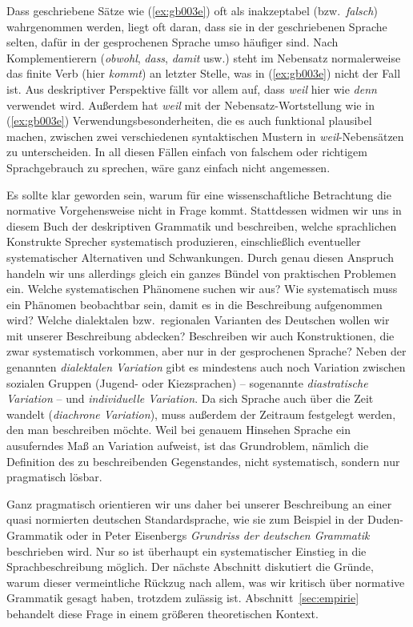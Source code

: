 Dass geschriebene Sätze wie (\ref{ex:gb003e}) oft als inakzeptabel (bzw.\ \textit{falsch}) wahrgenommen werden, liegt oft daran, dass sie in der geschriebenen Sprache selten, dafür in der gesprochenen Sprache umso häufiger sind.
Nach Komplementierern (\textit{obwohl}, \textit{dass}, \textit{damit} usw.) steht im Nebensatz normalerweise das finite Verb (hier \textit{kommt}) an letzter Stelle, was in (\ref{ex:gb003e}) nicht der Fall ist.
Aus deskriptiver Perspektive fällt vor allem auf, dass \textit{weil} hier wie \textit{denn} verwendet wird.
Außerdem hat \textit{weil} mit der Nebensatz-Wortstellung wie in (\ref{ex:gb003e}) Verwendungsbesonderheiten, die es auch funktional plausibel machen, zwischen zwei verschiedenen syntaktischen Mustern in \textit{weil}-Nebensätzen zu unterscheiden.
In all diesen Fällen einfach von falschem oder richtigem Sprachgebrauch zu sprechen, wäre ganz einfach nicht angemessen.

Es sollte klar geworden sein, warum für eine wissenschaftliche Betrachtung die normative Vorgehensweise nicht in Frage kommt.
Stattdessen widmen wir uns in diesem Buch der deskriptiven Grammatik und beschreiben, welche sprachlichen Konstrukte Sprecher systematisch produzieren, einschließlich eventueller systematischer Alternativen und Schwankungen.
Durch genau diesen Anspruch handeln wir uns allerdings gleich ein ganzes Bündel von praktischen Problemen ein.
Welche systematischen Phänomene suchen wir aus?
Wie systematisch muss ein Phänomen beobachtbar sein, damit es in die Beschreibung aufgenommen wird?
Welche dialektalen bzw.\ regionalen Varianten des Deutschen wollen wir mit unserer Beschreibung abdecken?
Beschreiben wir auch Konstruktionen, die zwar systematisch vorkommen, aber nur in der gesprochenen Sprache?
Neben der genannten \textit{dialektalen Variation} gibt es mindestens auch noch Variation zwischen sozialen Gruppen (\zB Jugend- oder Kiezsprachen) -- sogenannte \textit{diastratische Variation} -- und \textit{individuelle Variation}.
Da sich Sprache auch über die Zeit wandelt (\textit{diachrone Variation}), muss außerdem der Zeitraum festgelegt werden, den man beschreiben möchte.
Weil bei genauem Hinsehen Sprache ein ausuferndes Maß an Variation aufweist, ist das Grundroblem, nämlich die Definition des zu beschreibenden Gegenstandes, nicht systematisch, sondern nur pragmatisch lösbar.
 
Ganz pragmatisch orientieren wir uns daher bei unserer Beschreibung an einer quasi normierten deutschen Standardsprache, wie sie zum Beispiel in der Duden-Grammatik \citep{Duden8} oder in Peter Eisenbergs \textit{Grundriss der deutschen Grammatik} \citep{Eisenberg1,Eisenberg2} beschrieben wird.
Nur so ist überhaupt ein systematischer Einstieg in die Sprachbeschreibung möglich.
Der nächste Abschnitt diskutiert die Gründe, warum dieser vermeintliche Rückzug nach allem, was wir kritisch über normative Grammatik gesagt haben, trotzdem zulässig ist.
Abschnitt~\ref{sec:empirie} behandelt diese Frage in einem größeren theoretischen Kontext.

